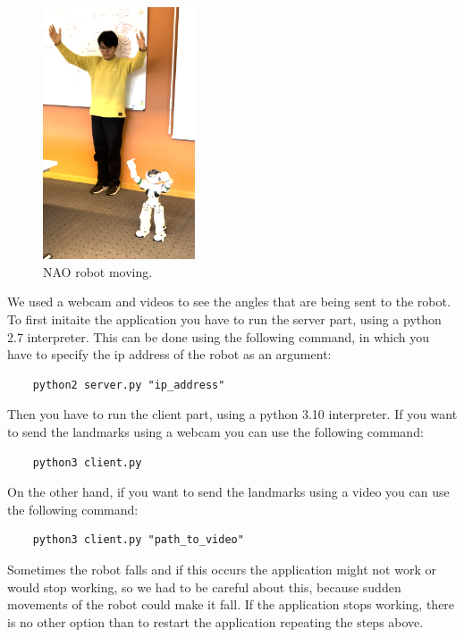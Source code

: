 \documentclass[conference]{IEEEtran}
\begin{document}
\begin{figure}[htbp]
    \centerline{\includegraphics[width=0.4\textwidth]{images/RobotWorking.png}}
    \caption{NAO robot moving.}
    \label{RobotWorking}
    \end{figure}


We used a webcam and videos to see the angles that are being sent to the robot. To first initaite the application you have to run the server part, using a python 2.7 interpreter. 
This can be done using the following command, in which you have to specify the ip address of the robot as an argument:
\begin{verbatim}
    python2 server.py "ip_address"
\end{verbatim}
Then you have to run the client part, using a python 3.10 interpreter. 
If you want to send the landmarks using a webcam you can use the following command:
\begin{verbatim}
    python3 client.py 
\end{verbatim}
On the other hand, if you want to send the landmarks using a video you can use the following command:
\begin{verbatim}
    python3 client.py "path_to_video"
\end{verbatim}


Sometimes the robot falls and if this occurs the application might not work or would stop working, so we had to be careful about this, because sudden movements of the robot could make it fall. 
If the application stops working, there is no other option than to restart the application repeating the steps above.


\end{document}
